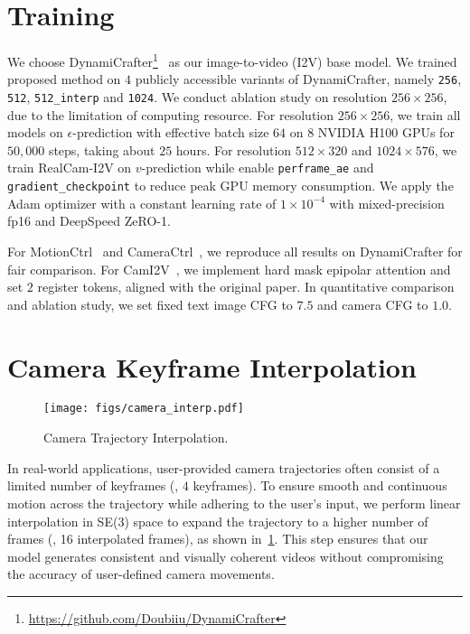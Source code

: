 \section{Training}

We choose DynamiCrafter\footnote{\url{https://github.com/Doubiiu/DynamiCrafter}}~\cite{Xing2023} as our image-to-video (I2V) base model.
We trained proposed method on \(4\) publicly accessible variants of DynamiCrafter, namely \texttt{256}, \texttt{512}, \texttt{512\_interp} and \texttt{1024}.
We conduct ablation study on resolution \(256 \times 256\), due to the limitation of computing resource.
For resolution \(256 \times 256\), we train all models on \(\epsilon\)-prediction with effective batch size \(64\) on \(8\) NVIDIA H100 GPUs for \(50,000\) steps, taking about \(25\) hours.
For resolution \(512 \times 320\) and \(1024 \times 576\), we train RealCam-I2V on \(v\)-prediction while enable \texttt{perframe\_ae} and \texttt{gradient\_checkpoint} to reduce peak GPU memory consumption.
We apply the Adam optimizer with a constant learning rate of \(1 \times 10^{-4}\) with mixed-precision fp16 and DeepSpeed ZeRO-1.

For MotionCtrl~\cite{Wang2024Motionctrl} and CameraCtrl~\cite{He2024Cameractrl}, we reproduce all results on DynamiCrafter for fair comparison.
For CamI2V~\cite{zheng2024cami2v}, we implement hard mask epipolar attention and set \(2\) register tokens, aligned with the original paper. 
In quantitative comparison and ablation study, we set fixed text image CFG to \(7.5\) and camera CFG to \(1.0\).


\section{Camera Keyframe Interpolation}

\begin{figure}[!t]
    \centering
    \texttt{[image: figs/camera\_interp.pdf]}
    \caption{Camera Trajectory Interpolation.
    }
    \label{fig:camera_interp}
    \vspace{-4mm}
\end{figure}

In real-world applications, user-provided camera trajectories often consist of a limited number of keyframes (\eg, \(4\) keyframes). To ensure smooth and continuous motion across the trajectory while adhering to the user's input, we perform linear interpolation in SE(3) space to expand the trajectory to a higher number of frames (\eg, 16 interpolated frames), as shown in~\cref{fig:camera_interp}. This step ensures that our model generates consistent and visually coherent videos without compromising the accuracy of user-defined camera movements.